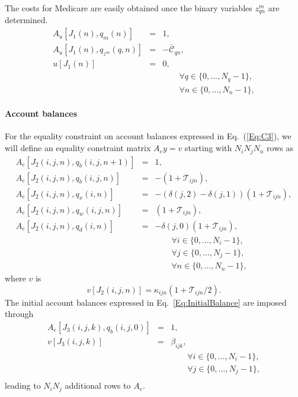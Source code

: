 \documentclass{report}[fleqn,11pt]
\begin{document}
The costs for Medicare are easily obtained once the binary variables
$z^m_{qn}$ are determined.
\begin{eqnarray}
	A_u[J_1(n), q_{m}(n)] &=& 1, \nonumber \\
	A_u[J_1(n), q_{z^m}(q, n)] &=& -\bar{\mathcal{C}}_{qn}, \nonumber \\
	u[J_1(n)] &=& 0,\\
	&&\qquad\forall q \in \{0,\ldots, N_q - 1\}, \nonumber\\
	&&\qquad\forall n \in \{0,\ldots, N_n - 1\},\nonumber
\end{eqnarray}

\paragraph*{Account balances}
For the equality constraint on account balances expressed in Eq.~(\ref{Eq:C3}),
we will define an equality constraint matrix $A_ey = v$ starting
with $N_iN_jN_n$ rows as
\begin{eqnarray}
	\label{Eq:B1}
	A_e[J_2(i, j, n), q_b(i, j, n+1)] &=& 1, \nonumber \\
	A_e[J_2(i, j, n), q_b(i, j, n)] &=& -(1 + \mathcal{T}_{ijn}), \nonumber \\
	A_e[J_2(i, j, n), q_x(i, n)] &=& -(\delta(j, 2) - \delta(j, 1))(1 + \mathcal{T}_{ijn}), \nonumber \\
	A_e[J_2(i, j, n), q_w(i, j, n)] &=& (1 + \mathcal{T}_{ijn}), \nonumber \\
	A_e[J_2(i, j, n), q_d(i, n)] &=& -\delta(j, 0)(1 + \mathcal{T}_{ijn}), \\
	&&\qquad\forall i \in \{0,\ldots, N_i-1\},\nonumber\\
	&&\qquad\forall j \in \{0,\ldots, N_j-1\},\nonumber\\
	&&\qquad\forall n \in \{0,\ldots, N_n-1\}, \nonumber
\end{eqnarray}
where $v$ is
\begin{equation}
	v[J_2(i, j, n)] = \kappa_{ijn}(1 + \mathcal{T}_{ijn}/2).
\end{equation}
The initial account balances expressed in Eq.~\ref{Eq:InitialBalance} are imposed through
\begin{eqnarray}
	A_e[J_3(i, j, k), q_b(i, j, 0)] &=& 1, \nonumber \\
	v[J_3(i, j, k)] &=& \beta_{ijk},  \\
	&&\qquad\forall i \in \{0,\ldots, N_i-1\},\nonumber\\
	&&\qquad\forall j \in \{0,\ldots, N_j-1\},\nonumber\\
\end{eqnarray}
leading to $N_i N_j$ additional rows to $A_e$.
\end{document}
